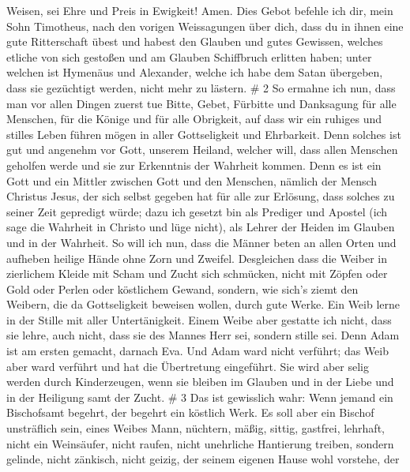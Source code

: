 Weisen, sei Ehre und Preis in Ewigkeit! Amen.  Dies Gebot
befehle ich dir, mein Sohn Timotheus, nach den vorigen Weissagungen über
dich, dass du in ihnen eine gute Ritterschaft übest  und
habest den Glauben und gutes Gewissen, welches etliche von sich gestoßen
und am Glauben Schiffbruch erlitten haben;  unter welchen
ist Hymenäus und Alexander, welche ich habe dem Satan übergeben, dass
sie gezüchtigt werden, nicht mehr zu lästern. \# 2  So
ermahne ich nun, dass man vor allen Dingen zuerst tue Bitte, Gebet,
Fürbitte und Danksagung für alle Menschen,  für die Könige
und für alle Obrigkeit, auf dass wir ein ruhiges und stilles Leben
führen mögen in aller Gottseligkeit und Ehrbarkeit.  Denn
solches ist gut und angenehm vor Gott, unserem Heiland, 
welcher will, dass allen Menschen geholfen werde und sie zur Erkenntnis
der Wahrheit kommen.  Denn es ist ein Gott und ein Mittler
zwischen Gott und den Menschen, nämlich der Mensch Christus Jesus,
 der sich selbst gegeben hat für alle zur Erlösung, dass
solches zu seiner Zeit gepredigt würde;  dazu ich gesetzt
bin als Prediger und Apostel (ich sage die Wahrheit in Christo und lüge
nicht), als Lehrer der Heiden im Glauben und in der Wahrheit.
 So will ich nun, dass die Männer beten an allen Orten und
aufheben heilige Hände ohne Zorn und Zweifel.  Desgleichen
dass die Weiber in zierlichem Kleide mit Scham und Zucht sich schmücken,
nicht mit Zöpfen oder Gold oder Perlen oder köstlichem Gewand,
 sondern, wie sich's ziemt den Weibern, die da
Gottseligkeit beweisen wollen, durch gute Werke.  Ein Weib
lerne in der Stille mit aller Untertänigkeit.  Einem Weibe
aber gestatte ich nicht, dass sie lehre, auch nicht, dass sie des Mannes
Herr sei, sondern stille sei.  Denn Adam ist am ersten
gemacht, darnach Eva.  Und Adam ward nicht verführt; das
Weib aber ward verführt und hat die Übertretung eingeführt.
 Sie wird aber selig werden durch Kinderzeugen, wenn sie
bleiben im Glauben und in der Liebe und in der Heiligung samt der Zucht.
\# 3  Das ist gewisslich wahr: Wenn jemand ein Bischofsamt
begehrt, der begehrt ein köstlich Werk.  Es soll aber ein
Bischof unsträflich sein, eines Weibes Mann, nüchtern, mäßig, sittig,
gastfrei, lehrhaft,  nicht ein Weinsäufer, nicht raufen,
nicht unehrliche Hantierung treiben, sondern gelinde, nicht zänkisch,
nicht geizig,  der seinem eigenen Hause wohl vorstehe, der
